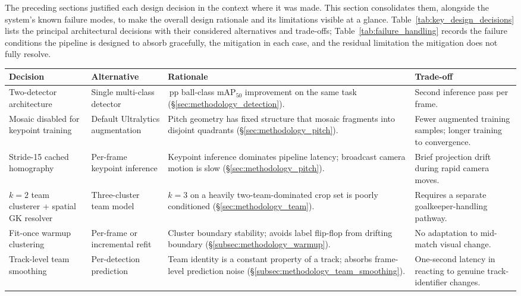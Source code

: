 The preceding sections justified each design decision in the context where
it was made. This section consolidates them, alongside the system's known
failure modes, to make the overall design rationale and its limitations
visible at a glance. Table~\ref{tab:key_design_decisions} lists the
principal architectural decisions with their considered alternatives and
trade-offs; Table~\ref{tab:failure_handling} records the failure conditions
the pipeline is designed to absorb gracefully, the mitigation in each case,
and the residual limitation the mitigation does not fully resolve.

\begin{table}[!htbp]
\centering
\small
\renewcommand{\arraystretch}{1.2}
\begin{tabular}{
  >{\raggedright\arraybackslash}p{3.4cm}
  >{\raggedright\arraybackslash}p{2.8cm}
  >{\raggedright\arraybackslash}p{4.0cm}
  >{\raggedright\arraybackslash}p{3.6cm}
}
\toprule
\textbf{Decision} & \textbf{Alternative} & \textbf{Rationale} & \textbf{Trade-off} \\
\midrule
Two-detector architecture & Single multi-class detector & 49\,pp ball-class $\mathrm{mAP}_{50}$ improvement on the same task (§\ref{sec:methodology_detection}). & Second inference pass per frame. \\
Mosaic disabled for keypoint training & Default Ultralytics augmentation & Pitch geometry has fixed structure that mosaic fragments into disjoint quadrants (§\ref{sec:methodology_pitch}). & Fewer augmented training samples; longer training to convergence. \\
Stride-15 cached homography & Per-frame keypoint inference & Keypoint inference dominates pipeline latency; broadcast camera motion is slow (§\ref{sec:methodology_pitch}). & Brief projection drift during rapid camera moves. \\
$k=2$ team clusterer + spatial GK resolver & Three-cluster team model & $k=3$ on a heavily two-team-dominated crop set is poorly conditioned (§\ref{sec:methodology_team}). & Requires a separate goalkeeper-handling pathway. \\
Fit-once warmup clustering & Per-frame or incremental refit & Cluster boundary stability; avoids label flip-flop from drifting boundary (§\ref{subsec:methodology_warmup}). & No adaptation to mid-match visual change. \\
Track-level team smoothing & Per-detection prediction & Team identity is a constant property of a track; absorbs frame-level prediction noise (§\ref{subsec:methodology_team_smoothing}). & One-second latency in reacting to genuine track-identifier changes. \\

\end{tabular}
\end{table}
